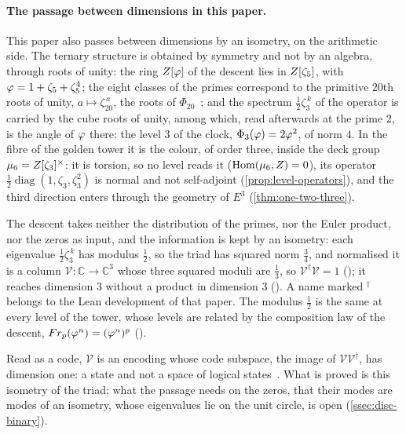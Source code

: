 \paragraph{The passage between dimensions in this paper.}
This paper also passes between dimensions by an isometry, on the arithmetic side.  The ternary structure is obtained by symmetry and not by an algebra, through roots of unity: the ring $Z[\varphi]$ of the descent lies in $Z[\zeta_5]$, with $\varphi=1+\zeta_5+\zeta_5^4$; the eight classes of the primes correspond to the primitive $20$th roots of unity, $a\mapsto\zeta_{20}^{\,a}$, the roots of $\Phi_{20}$~\cite{grisales25,acevedo21}; and the spectrum $\tfrac12\zeta_3^{\,k}$ of the operator
is carried by the cube roots of unity, among which,
read afterwards at the prime $2$, is the angle of
$\varphi$ there: the level $3$ of the clock,
$\Phi_3(\varphi)=2\varphi^2$, of norm $4$.  In the fibre of the golden tower it is the colour, of order three, inside the deck group
$\mu_6=Z[\zeta_3]^{\times}$: it is torsion, so no level reads it ($\operatorname{Hom}(\mu_6,Z)=0$), its operator
$\tfrac12\operatorname{diag}(1,\zeta_3,\zeta_3^2)$ is normal and not self-adjoint (\cref{prop:level-operators}),
and the third direction enters through the geometry of $E^3$ (\cref{thm:one-two-three}).

The descent takes neither the distribution of the primes, nor the Euler product, nor the zeros as input, and the information is kept by an isometry: each eigenvalue $\tfrac12\zeta_3^{\,k}$ has modulus $\tfrac12$, so the triad has squared norm $\tfrac34$, and normalised it is a column $\mathcal V\colon\mathbb{C}\to\mathbb{C}^3$ whose three squared moduli are $\tfrac13$, so $\mathcal V^\dagger\mathcal V=1$ (); it reaches dimension $3$ without a product in dimension $3$
\cite[the lemma \emph{Isometric embedding of the triad} and the proposition \emph{Two towers, one microstate}]{gonzalez26cw}
 ().  A name marked $^{\dagger}$ belongs to the Lean
development of that paper.  The modulus $\tfrac12$ is the same at every level of the tower, whose levels are related by the composition law of the descent, $Fr_p(\varphi^n)=(\varphi^n)^p$
 ().

Read as a code, $\mathcal V$ is an encoding whose code subspace, the image
of $\mathcal V\mathcal V^\dagger$, has dimension one: a state and not a space of logical states~\cite{almheiri15,pastawski15}.  What is
proved is this isometry of the triad; what the passage needs on the zeros, that their modes are modes of an
isometry, whose eigenvalues lie on the unit circle, is open (\cref{ssec:disc-binary}).

